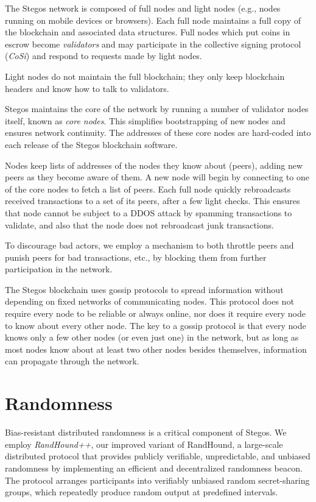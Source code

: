 \documentclass[a4paper, 10pt, conference]{ieeeconf}
\begin{document}
The Stegos network is composed of full nodes and light nodes (e.g., nodes running on mobile devices or browsers). Each full node maintains a full copy of the blockchain and associated data structures. Full nodes which put coins in escrow become \textit{validators} and may participate in the collective signing protocol (\textit{CoSi}) and respond to requests made by light nodes. 

Light nodes do not maintain the full blockchain; they only keep blockchain headers and know how to talk to validators. 

Stegos maintains the core of the network by running a number of validator nodes itself, known as \textit{core nodes}. This simplifies bootstrapping of new nodes and ensures network continuity. The addresses of these core nodes are hard-coded into each release of the Stegos blockchain software.

Nodes keep lists of addresses of the nodes they know about (peers), adding new peers as they become aware of them. A new node will begin by connecting to one of the core nodes to fetch a list of peers. Each full node quickly rebroadcasts received transactions to a set of its peers, after a few light checks. This ensures that node cannot be subject to a DDOS attack by spamming transactions to validate, and also that the node does not rebroadcast junk transactions.

To discourage bad actors, we employ a mechanism to both throttle peers and punish peers for bad transactions, etc., by blocking them from further participation in the network.

The Stegos blockchain uses gossip protocols to spread information without depending on fixed networks of communicating nodes. This protocol does not require every node to be reliable or always online, nor does it require every node to know about every other node. The key to a gossip protocol is that every node knows only a few other nodes (or even just one) in the network, but as long as most nodes know about at least two other nodes besides themselves, information can propagate through the network.

\section{Randomness}\label{randomness}

Bias-resistant distributed randomness is a critical component of Stegos. We employ \textit{RandHound++}, our improved variant of RandHound\cite{c12}, a large-scale distributed protocol that provides publicly verifiable, unpredictable, and unbiased randomness by implementing an efficient and decentralized randomness beacon. The protocol arranges participants into verifiably unbiased random secret-sharing groups, which repeatedly produce random output at predefined intervals. 
\end{document}
